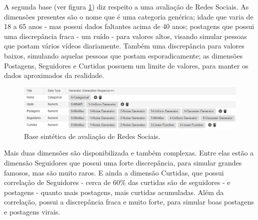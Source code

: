 \documentclass[
	12pt,				%
	openright,			%
	twoside,			%
	a4paper,			%
	english,			%
	brazil				%
	]{abntex2}
\begin{document}
		A segunda base (ver figura \ref{fig:RSmodelo}) diz respeito a uma avaliação de Redes Sociais.
		As dimensões presentes são
		 o nome que é uma categoria genérica;
		 idade que varia de 18 a 65 anos - mas possui dados faltantes acima de 40 anos;
		 postagens que possui uma discrepância fraca - um ruído - para valores altos, visando simular pessoas que postam vários vídeos diariamente.
		 Também uma discrepância para valores baixos, simulando aquelas pessoas que postam esporadicamente;
		 as dimensões Postagens, Seguidores e Curtidas possuem um limite de valores, para manter os dados aproximados da realidade.
		\par
		\begin{figure}[h!]
			\centering
			\includegraphics[width=\linewidth]{./figures/Resultados/RSmodelo.jpg}
			\caption{Base sintética de avaliação de Redes Sociais.}
			\label{fig:RSmodelo}
		\end{figure}

		Mais duas dimensões são disponibilizada e também complexas.
		Entre elas estão a dimensão Seguidores que possui uma forte discrepância, para simular grandes famosos, mas são muito raros.
		E ainda a dimensão Curtidas, que possui correlação de Seguidores - cerca de 60\% das curtidas são de seguidores - e postagens - quanto mais postagens, mais curtidas acumuladas.
		Além da correlação, possui a discrepância fraca e muito forte, para simular boas postagens e postagens virais.
		\par

\end{document}
